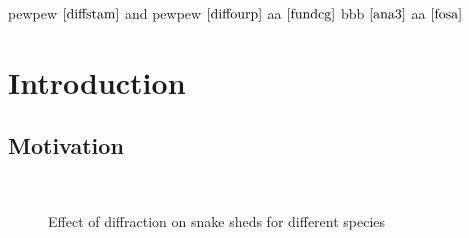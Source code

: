 pewpew $\cite{diffstam}$ and pewpew $\cite{diffourp}$ aa $\cite{fundcg}$ bbb $\cite{ana3}$  aa $\cite{fosa}$

\chapter{Introduction}
\section{Motivation}
% 





\begin{figure}[H]
  \centering
~
  \caption{Effect of diffraction on snake sheds for different species}
  \label{fig:snakespecies}
\end{figure}


